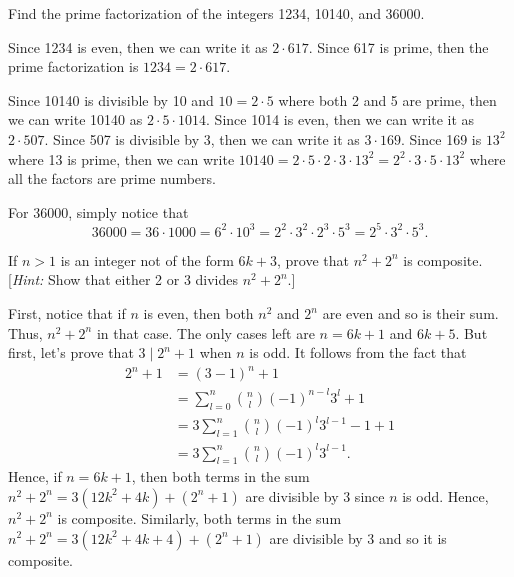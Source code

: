 \begin{exercise}
    Find the prime factorization of the integers 1234, 10140, and 36000. \\
\end{exercise}

\begin{solution}
    Since 1234 is even, then we can write it as $2 \cdot 617$. Since 617 is prime, then the prime factorization is $1234 = 2 \cdot 617$.

    Since 10140 is divisible by 10 and $10 = 2 \cdot 5$ where both 2 and 5 are prime, then we can write 10140 as $2 \cdot 5 \cdot 1014$. Since 1014 is even, then we can write it as $2 \cdot 507$. Since 507 is divisible by 3, then we can write it as $3 \cdot 169$. Since 169 is $13^2$ where 13 is prime, then we can write $10140 = 2 \cdot 5 \cdot 2 \cdot 3 \cdot 13^2 = 2^2 \cdot 3 \cdot 5 \cdot 13^2$ where all the factors are prime numbers.

    For 36000, simply notice that
    $$36000 = 36 \cdot 1000 = 6^2 \cdot 10^3 = 2^2 \cdot 3^2 \cdot 2^3 \cdot 5^3 = 2^5 \cdot 3^2 \cdot 5^3.$$
\end{solution}

\begin{exercise}
    If $n > 1$ is an integer not of the form $6k+3$, prove that $n^2 + 2^n$ is composite. [\textit{Hint:} Show that either 2 or 3 divides $n^2 + 2^n$.] \\
\end{exercise}

\begin{solution}
    First, notice that if $n$ is even, then both $n^2$ and $2^n$ are even and so is their sum. Thus, $n^2 + 2^n$ in that case. The only cases left are $n = 6k+1$ and $6k+5$. But first, let's prove that $3 \mid 2^n + 1$ when $n$ is odd. It follows from the fact that
    \begin{align*}
        2^n + 1 &= (3-1)^n + 1 \\
        &= \sum_{l=0}^{n}\binom{n}{l}(-1)^{n-l}3^l + 1 \\
        &= 3\sum_{l=1}^{n}\binom{n}{l}(-1)^l3^{l-1} - 1 + 1 \\
        &= 3\sum_{l=1}^{n}\binom{n}{l}(-1)^l3^{l-1}.
    \end{align*}
    Hence, if $n = 6k+1$, then both terms in the sum $n^2 + 2^n = 3(12k^2 + 4k) + (2^n + 1)$ are divisible by 3 since $n$ is odd. Hence, $n^2 + 2^n$ is composite. Similarly, both terms in the sum $n^2 + 2^n = 3(12k^2 + 4k + 4) + (2^n + 1)$ are divisible by 3 and so it is composite. \\
\end{solution}

